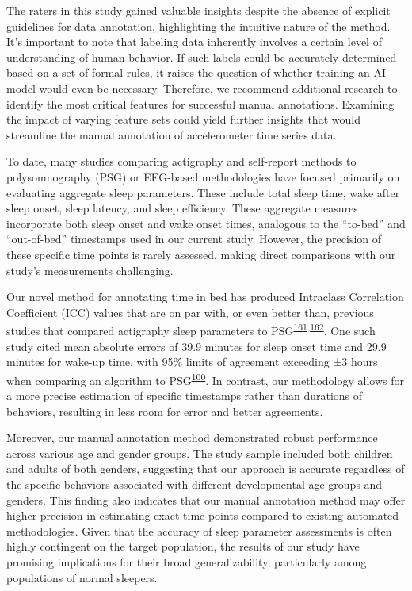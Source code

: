 \documentclass[
  10pt,
]{scrbook}
\begin{document}
The raters in this study gained valuable insights despite the absence of
explicit guidelines for data annotation, highlighting the intuitive
nature of the method. It's important to note that labeling data
inherently involves a certain level of understanding of human behavior.
If such labels could be accurately determined based on a set of formal
rules, it raises the question of whether training an AI model would even
be necessary. Therefore, we recommend additional research to identify
the most critical features for successful manual annotations. Examining
the impact of varying feature sets could yield further insights that
would streamline the manual annotation of accelerometer time series
data.

To date, many studies comparing actigraphy and self-report methods to
polysomnography (PSG) or EEG-based methodologies have focused primarily
on evaluating aggregate sleep parameters. These include total sleep
time, wake after sleep onset, sleep latency, and sleep efficiency. These
aggregate measures incorporate both sleep onset and wake onset times,
analogous to the ``to-bed'' and ``out-of-bed'' timestamps used in our
current study. However, the precision of these specific time points is
rarely assessed, making direct comparisons with our study's measurements
challenging.

Our novel method for annotating time in bed has produced Intraclass
Correlation Coefficient (ICC) values that are on par with, or even
better than, previous studies that compared actigraphy sleep parameters
to
PSG\textsuperscript{\protect\hyperlink{ref-haghayegh_application_2020}{161},\protect\hyperlink{ref-yavuz-kodat_2019}{162}}.
One such study cited mean absolute errors of 39.9 minutes for sleep
onset time and 29.9 minutes for wake-up time, with 95\% limits of
agreement exceeding ±3 hours when comparing an algorithm to
PSG\textsuperscript{\protect\hyperlink{ref-van_hees_estimating_2018}{100}}.
In contrast, our methodology allows for a more precise estimation of
specific timestamps rather than durations of behaviors, resulting in
less room for error and better agreements.

Moreover, our manual annotation method demonstrated robust performance
across various age and gender groups. The study sample included both
children and adults of both genders, suggesting that our approach is
accurate regardless of the specific behaviors associated with different
developmental age groups and genders. This finding also indicates that
our manual annotation method may offer higher precision in estimating
exact time points compared to existing automated methodologies. Given
that the accuracy of sleep parameter assessments is often highly
contingent on the target population, the results of our study have
promising implications for their broad generalizability, particularly
among populations of normal sleepers.
\end{document}
